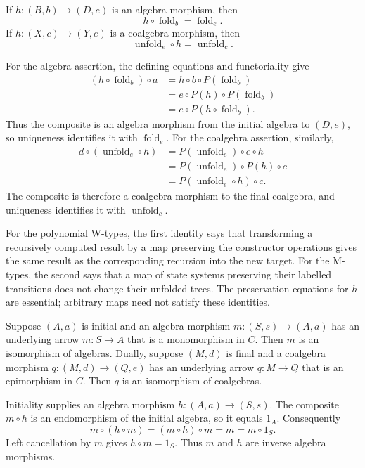 \begin{proposition}
If $h:(B,b)\to(D,e)$ is an algebra morphism, then
\[
h\circ\operatorname{fold}_b=\operatorname{fold}_e.
\]
If $h:(X,c)\to(Y,e)$ is a coalgebra morphism, then
\[
\operatorname{unfold}_e\circ h=\operatorname{unfold}_c.
\]
\end{proposition}
\Proof
For the algebra assertion, the defining equations and functoriality give
\[
\begin{aligned}
(h\circ\operatorname{fold}_b)\circ a
 &=h\circ b\circ P(\operatorname{fold}_b)\\
 &=e\circ P(h)\circ P(\operatorname{fold}_b)\\
 &=e\circ P(h\circ\operatorname{fold}_b).
\end{aligned}
\]
Thus the composite is an algebra morphism from the initial algebra to
$(D,e)$, so uniqueness identifies it with $\operatorname{fold}_e$.
For the coalgebra assertion, similarly,
\[
\begin{aligned}
d\circ(\operatorname{unfold}_e\circ h)
 &=P(\operatorname{unfold}_e)\circ e\circ h\\
 &=P(\operatorname{unfold}_e)\circ P(h)\circ c\\
 &=P(\operatorname{unfold}_e\circ h)\circ c.
\end{aligned}
\]
The composite is therefore a coalgebra morphism to the final coalgebra,
and uniqueness identifies it with $\operatorname{unfold}_c$.
\Done

For the polynomial W-types, the first identity says that transforming
a recursively computed result by a map preserving the constructor
operations gives the same result as the corresponding recursion into
the new target. For the M-types, the second says that a map of state
systems preserving their labelled transitions does not change their
unfolded trees. The preservation equations for $h$ are essential;
arbitrary maps need not satisfy these identities.

\begin{proposition}
Suppose $(A,a)$ is initial and an algebra morphism
$m:(S,s)\to(A,a)$ has an underlying arrow $m:S\to A$ that is a
monomorphism in $C$. Then $m$ is an isomorphism of algebras.
Dually, suppose $(M,d)$ is final and a coalgebra morphism
$q:(M,d)\to(Q,e)$ has an underlying arrow $q:M\to Q$ that is an
epimorphism in $C$. Then $q$ is an isomorphism of coalgebras.
\end{proposition}
\Proof
Initiality supplies an algebra morphism $h:(A,a)\to(S,s)$.
The composite $m\circ h$ is an endomorphism of the initial algebra,
so it equals $1_A$. Consequently
\[
m\circ(h\circ m)=(m\circ h)\circ m=m=m\circ1_S.
\]
Left cancellation by $m$ gives $h\circ m=1_S$. Thus $m$ and $h$
are inverse algebra morphisms.

